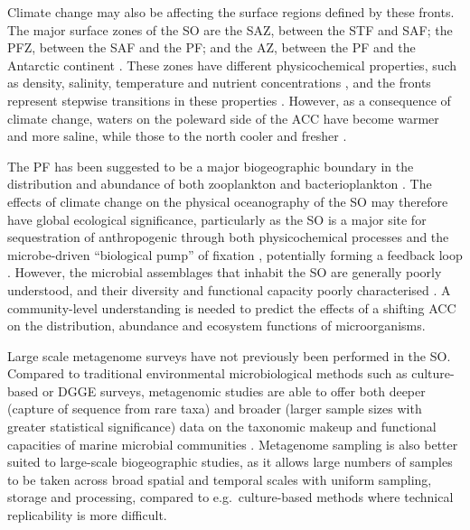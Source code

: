 Climate change may also be affecting the surface regions defined by these fronts.
The major surface zones of the \ac{SO} are the \ac{SAZ}, between the \ac{STF} and \ac{SAF}; the \ac{PFZ}, between the \ac{SAF} and the \ac{PF}; and the \ac{AZ}, between the \ac{PF} and the Antarctic continent .
These zones have different physicochemical properties, such as density, salinity, temperature and nutrient concentrations \cite{Sokolov:2002tc}, and the fronts represent stepwise transitions in these properties \cite{WhitworthIII:1987ky}.
However, as a consequence of climate change, waters on the poleward side of the \ac{ACC} have become warmer and more saline, while those to the north cooler and fresher \cite{Boning:2008il}.

The \ac{PF} has been suggested to be a major biogeographic boundary in the distribution and abundance of both zooplankton \cite{Chiba:2001un,Hunt:2001vp,Esper:2002ui,Ward:2003db} and bacterioplankton \cite{Selje:2004ka,Abell:2005ji,Giebel:2009hr,Weber:2010fi}.
The effects of climate change on the physical oceanography of the \ac{SO} may therefore have global ecological significance, particularly as the \ac{SO} is a major site for sequestration of anthropogenic  \cite{Sabine:2004fz,MikaloffFletcher:2006ct} through both physicochemical processes and the microbe-driven ``biological pump'' of  fixation \cite{Thomalla:2011hi}, potentially forming a feedback loop \cite{Cox:2000ko}.
However, the microbial assemblages that inhabit the \ac{SO} are generally poorly understood, and their diversity and functional capacity poorly characterised \citep[reviewed in][]{Murray:2007db}.
A community-level understanding is needed to predict the effects of a shifting \ac{ACC} on the distribution, abundance and ecosystem functions of microorganisms.

Large scale metagenome surveys have not previously been performed in the \ac{SO}.
Compared to traditional environmental microbiological methods such as culture-based or DGGE surveys, metagenomic studies are able to offer both deeper (capture of sequence from rare taxa) and broader (larger sample sizes with greater statistical significance) data on the taxonomic makeup and functional capacities of marine microbial communities \citep[e.g.][]{Rusch:2007ez,Angly:2006wf,Dinsdale:2008cd}.
Metagenome sampling is also better suited to large-scale biogeographic studies, as it allows large numbers of samples to be taken across broad spatial and temporal scales with uniform sampling, storage and processing, compared to e.g.\ culture-based methods where technical replicability is more difficult.


